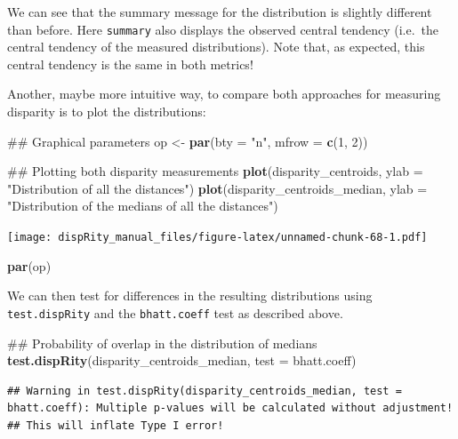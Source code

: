 \documentclass[]{book}
\newenvironment{Shaded}{\begin{snugshade}}{\end{snugshade}}
\newcommand{\KeywordTok}[1]{\textcolor[rgb]{0.13,0.29,0.53}{\textbf{#1}}}
\newcommand{\DataTypeTok}[1]{\textcolor[rgb]{0.13,0.29,0.53}{#1}}
\newcommand{\DecValTok}[1]{\textcolor[rgb]{0.00,0.00,0.81}{#1}}
\newcommand{\StringTok}[1]{\textcolor[rgb]{0.31,0.60,0.02}{#1}}
\newcommand{\NormalTok}[1]{#1}
\theoremstyle{definition}
\theoremstyle{definition}
\theoremstyle{remark}
\begin{document}
We can see that the summary message for the distribution is slightly
different than before. Here \texttt{summary} also displays the observed
central tendency (i.e.~the central tendency of the measured
distributions). Note that, as expected, this central tendency is the
same in both metrics!

Another, maybe more intuitive way, to compare both approaches for
measuring disparity is to plot the distributions:

\begin{Shaded}
\begin{Highlighting}[]
\NormalTok{## Graphical parameters}
\NormalTok{op <-}\StringTok{ }\KeywordTok{par}\NormalTok{(}\DataTypeTok{bty =} \StringTok{"n"}\NormalTok{, }\DataTypeTok{mfrow =} \KeywordTok{c}\NormalTok{(}\DecValTok{1}\NormalTok{, }\DecValTok{2}\NormalTok{))}

\NormalTok{## Plotting both disparity measurements}
\KeywordTok{plot}\NormalTok{(disparity_centroids, }\DataTypeTok{ylab =} \StringTok{"Distribution of all the distances"}\NormalTok{)}
\KeywordTok{plot}\NormalTok{(disparity_centroids_median,}
     \DataTypeTok{ylab =} \StringTok{"Distribution of the medians of all the distances"}\NormalTok{)}
\end{Highlighting}
\end{Shaded}

\texttt{[image: dispRity\_manual\_files/figure-latex/unnamed-chunk-68-1.pdf]}

\begin{Shaded}
\begin{Highlighting}[]
\KeywordTok{par}\NormalTok{(op)}
\end{Highlighting}
\end{Shaded}

We can then test for differences in the resulting distributions using
\texttt{test.dispRity} and the \texttt{bhatt.coeff} test as described
above.

\begin{Shaded}
\begin{Highlighting}[]
\NormalTok{## Probability of overlap in the distribution of medians}
\KeywordTok{test.dispRity}\NormalTok{(disparity_centroids_median, }\DataTypeTok{test =}\NormalTok{ bhatt.coeff)}
\end{Highlighting}
\end{Shaded}

\begin{verbatim}
## Warning in test.dispRity(disparity_centroids_median, test = bhatt.coeff): Multiple p-values will be calculated without adjustment!
## This will inflate Type I error!
\end{verbatim}
\end{document}
